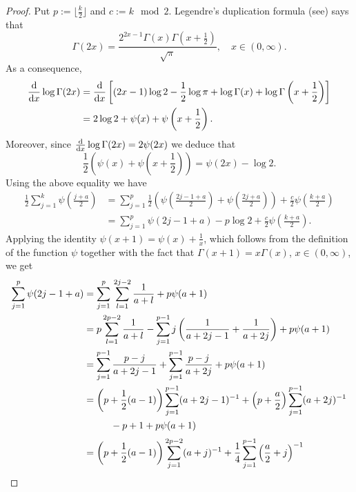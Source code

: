 \documentclass[10pt]{amsart}
\theoremstyle{definition}\newtheorem{defi}[theo]{Definition}\newtheorem{rema}[theo]{Remark}\newtheorem{exam}[theo]{Example}\newtheorem{exem}[theo]{Example}\newtheorem{nota}[theo]{Notation}
\newcommand{\dd}{{\rm d}}
\begin{document}
\begin{proof}
Put $p:=\lfloor\frac{k}{2}\rfloor$ and $c:= k\mod 2$. Legendre's duplication formula (see\linebreak\cite[p.~138]{NIST}) says that
\[
\Gamma(2x) = \frac{2^{2x-1}\Gamma(x)\Gamma\left(x+\frac{1}{2}\right)}{\sqrt{\pi}},\quad x\in(0,\infty).
\]
As a consequence,
\begin{align*}
\frac{\dd}{\dd x}\log\Gamma(2x) &=\frac{\dd}{\dd x}\left[(2x-1)\log 2-\frac{1}{2}\log\pi+\log\Gamma(x)+\log\Gamma\left(x+\frac{1}{2}\right)\right]\\
&=2\log 2+\psi(x)+\psi\left(x+\frac{1}{2}\right).
\end{align*}
Moreover, since $\frac{\dd}{\dd x}\log\Gamma(2x)=2\psi(2x)$ we deduce that
\begin{equation}\label{eq:DoublingPsi}
\frac{1}{2}\left(\psi(x)+\psi\left(x+\frac12\right)\right)=\psi(2x)-\log 2.
\end{equation}
Using the above equality we have
\begin{equation}\label{eq:1}
\begin{aligned}
\frac12\sum\limits_{j=1}^k\psi\left(\frac{j+a}{2}\right)&=\sum\limits_{j=1}^p\frac{1}{2}\left(\psi\left(\frac{2j-1+a}{2}\right)+\psi\left(\frac{2j+a}{2}\right)\right)+\frac{c}{2}\psi\left(\frac{k+a}{2}\right)\\
&=\sum\limits_{j=1}^p\psi(2j-1+a)-p\log 2+\frac{c}{2}\psi\left(\frac{k+a}{2}\right).
\end{aligned}
\end{equation}
Applying the identity $\psi(x+1)=\psi(x)+\frac{1}{x}$, which follows from the definition of the function $\psi$ together with the fact that $\Gamma(x+1)=x\Gamma(x)$, $x\in(0,\infty)$, we get
\begin{align*}
\sum\limits_{j=1}^p\psi(2j-1+a)&=\sum\limits_{j=1}^p\,\sum\limits_{l=1}^{2j-2}\frac{1}{a+l}+p\psi(a+1)\\
&=p\sum\limits_{l=1}^{2p-2}\frac{1}{a+l}-\sum\limits_{j=1}^{p-1}j\left(\frac{1}{a+2j-1}+\frac{1}{a+2j}\right)+p\psi(a+1)\\
&=\sum\limits_{j=1}^{p-1}\frac{p-j}{a+2j-1}+\sum\limits_{j=1}^{p-1}\frac{p-j}{a+2j}+p\psi(a+1)\\
&=\left(p+\frac{1}{2}(a-1)\right)\sum\limits_{j=1}^{p-1}(a+2j-1)^{-1}+\left(p+\frac{a}{2}\right)\sum\limits_{j=1}^{p-1}(a+2j)^{-1}\\
&\mkern50mu -p+1+p\psi(a+1)\\[0.20em]
&=\left(p+\frac{1}{2}(a-1)\right)\sum\limits_{j=1}^{2p-2}(a+j)^{-1}+\frac{1}{4}\sum\limits_{j=1}^{p-1}\left(\frac{a}{2}+j\right)^{-1}\\

\end{align*}
\end{proof}
\end{document}
